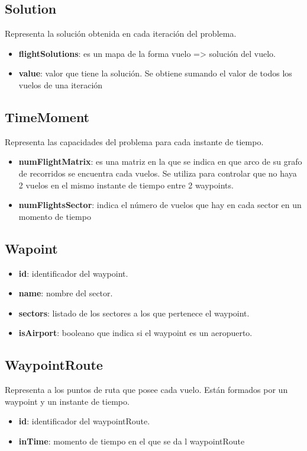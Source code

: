 \subsection*{Solution}
Representa la solución obtenida en cada iteración del problema.
\begin{itemize}
	\item \textbf{flightSolutions}: es un mapa de la forma vuelo => solución del vuelo.
	\item \textbf{value}: valor que tiene la solución. Se obtiene sumando el valor de todos los vuelos de una iteración
\end{itemize}

\subsection*{TimeMoment}
Representa las capacidades del problema para cada instante de tiempo.
\begin{itemize}
	\item \textbf{numFlightMatrix}: es una matriz en la que se indica en que arco de su grafo de recorridos se encuentra cada vuelos. Se utiliza para controlar que no haya 2 vuelos en el mismo instante de tiempo entre 2 waypoints.
	\item \textbf{numFlightsSector}: indica el número de vuelos que hay en cada sector en un momento de tiempo
\end{itemize}

\subsection*{Wapoint}
\begin{itemize}
	\item \textbf{id}: identificador del waypoint.
	\item \textbf{name}: nombre del sector.
	\item \textbf{sectors}: listado de los sectores a los que pertenece el waypoint.
	\item \textbf{isAirport}: booleano que indica si el waypoint es un aeropuerto.
\end{itemize}

\subsection*{WaypointRoute}
Representa a los puntos de ruta que posee cada vuelo. Están formados por un waypoint y un instante de tiempo.
\begin{itemize}
	\item \textbf{id}: identificador del waypointRoute.
	\item \textbf{inTime}: momento de tiempo en el que se da l waypointRoute
\end{itemize}